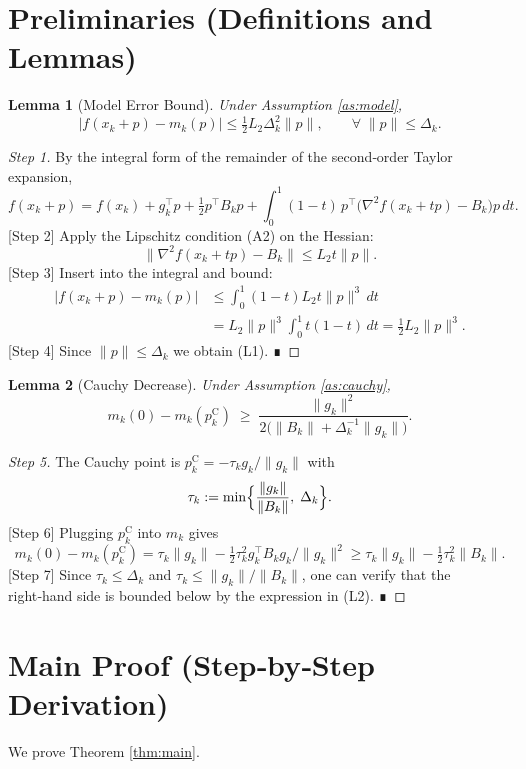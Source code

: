 \documentclass[11pt]{article}
\newtheorem{lemma}{Lemma}[section]
\begin{document}
\section*{Preliminaries (Definitions and Lemmas)}
\begin{lemma}[Model Error Bound]\label{lem:modelerror}
Under Assumption \ref{as:model},
\[
|f(x_{k}+p)-m_{k}(p)|
\le \tfrac12 L_{2}\Delta_{k}^{2}\|p\|,\qquad\forall\; \|p\|\le\Delta_{k}.
\tag{L1}
\]
\end{lemma}
\begin{proof}
[Step 1] By the integral form of the remainder of the second‑order Taylor expansion,
\[
f(x_{k}+p)=f(x_{k})+g_{k}^{\top}p+\tfrac12 p^{\top}B_{k}p
+\int_{0}^{1}(1-t)\,p^{\top}\bigl(\nabla^{2}f(x_{k}+tp)-B_{k}\bigr)p\,dt .
\]
[Step 2] Apply the Lipschitz condition (A2) on the Hessian:
\[
\bigl\|\nabla^{2}f(x_{k}+tp)-B_{k}\bigr\|
\le L_{2}t\|p\|.
\]
[Step 3] Insert into the integral and bound:
\[
\begin{aligned}
\bigl|f(x_{k}+p)-m_{k}(p)\bigr|
&\le \int_{0}^{1}(1-t)L_{2}t\|p\|^{3}\,dt\\
&=L_{2}\|p\|^{3}\int_{0}^{1}t(1-t)\,dt
= \tfrac12 L_{2}\|p\|^{3}.
\end{aligned}
\]
[Step 4] Since $\|p\|\le\Delta_{k}$ we obtain (L1).  ∎
\end{proof}

\begin{lemma}[Cauchy Decrease]\label{lem:cauchy}
Under Assumption \ref{as:cauchy},
\[
m_{k}(0)-m_{k}(p^{\mathrm{C}}_{k})
\;\ge\;
\frac{\|g_{k}\|^{2}}{2\bigl(\|B_{k}\|+ \Delta_{k}^{-1}\|g_{k}\|\bigr)}.
\tag{L2}
\]
\end{lemma}
\begin{proof}
[Step 5] The Cauchy point is $p^{\mathrm{C}}_{k}= -\tau_{k} g_{k}/\|g_{k}\|$ with
\[
\tau_{k}:=\min\Bigl\{\frac{\|g_{k}\|}{\|B_{k}\|},\;\Delta_{k}\Bigr\}.
\]
[Step 6] Plugging $p^{\mathrm{C}}_{k}$ into $m_{k}$ gives
\[
m_{k}(0)-m_{k}(p^{\mathrm{C}}_{k})
= \tau_{k}\|g_{k}\|-\tfrac12\tau_{k}^{2}g_{k}^{\top}B_{k}g_{k}/\|g_{k}\|^{2}
\ge \tau_{k}\|g_{k}\|-\tfrac12\tau_{k}^{2}\|B_{k}\|.
\]
[Step 7] Since $\tau_{k}\le\Delta_{k}$ and $\tau_{k}\le\|g_{k}\|/\|B_{k}\|$, one can verify that the right‑hand side is bounded below by the expression in (L2).  ∎
\end{proof}

\section*{Main Proof (Step‑by‑Step Derivation)}
We prove Theorem \ref{thm:main}.
\end{document}

